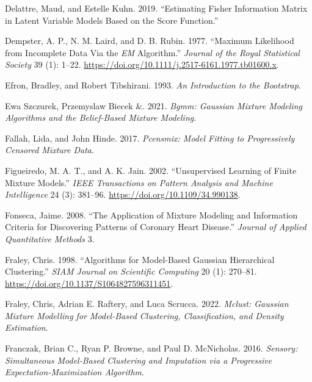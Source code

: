 \begin{CSLReferences}{1}{0}
\leavevmode{}%
Delattre, Maud, and Estelle Kuhn. 2019. {``Estimating {Fisher Information Matrix} in {Latent Variable Models} Based on the {Score Function}.''}

\leavevmode{}%
Dempster, A. P., N. M. Laird, and D. B. Rubin. 1977. {``Maximum {Likelihood} from {Incomplete Data Via} the {\emph{EM}} {Algorithm}.''} \emph{Journal of the Royal Statistical Society} 39 (1): 1--22. \url{https://doi.org/10.1111/j.2517-6161.1977.tb01600.x}.

\leavevmode{}%
Efron, Bradley, and Robert Tibshirani. 1993. \emph{An {Introduction} to the {Bootstrap}}.

\leavevmode{}%
Ewa Szczurek, Przemyslaw Biecek \&. 2021. \emph{Bgmm: Gaussian Mixture Modeling Algorithms and the Belief-Based Mixture Modeling}.

\leavevmode{}%
Fallah, Lida, and John Hinde. 2017. \emph{Pcensmix: Model Fitting to Progressively Censored Mixture Data}.

\leavevmode{}%
Figueiredo, M. A. T., and A. K. Jain. 2002. {``Unsupervised Learning of Finite Mixture Models.''} \emph{IEEE Transactions on Pattern Analysis and Machine Intelligence} 24 (3): 381--96. \url{https://doi.org/10.1109/34.990138}.

\leavevmode{}%
Fonseca, Jaime. 2008. {``The Application of Mixture Modeling and Information Criteria for Discovering Patterns of Coronary Heart Disease.''} \emph{Journal of Applied Quantitative Methods} 3.

\leavevmode{}%
Fraley, Chris. 1998. {``Algorithms for {Model-Based Gaussian Hierarchical Clustering}.''} \emph{SIAM Journal on Scientific Computing} 20 (1): 270--81. \url{https://doi.org/10.1137/S1064827596311451}.

\leavevmode{}%
Fraley, Chris, Adrian E. Raftery, and Luca Scrucca. 2022. \emph{Mclust: Gaussian Mixture Modelling for Model-Based Clustering, Classification, and Density Estimation}.

\leavevmode{}%
Franczak, Brian C., Ryan P. Browne, and Paul D. McNicholas. 2016. \emph{Sensory: Simultaneous Model-Based Clustering and Imputation via a Progressive Expectation-Maximization Algorithm}.


\end{CSLReferences}
